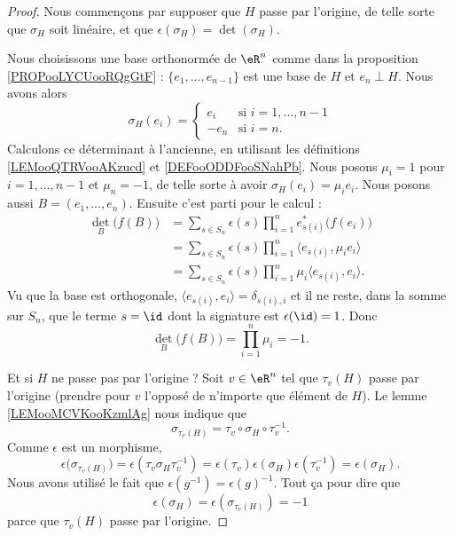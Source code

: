 \begin{proof}
	Nous commençons par supposer que \( H\) passe par l'origine, de telle sorte que \( \sigma_H\) soit linéaire, et que \( \epsilon(\sigma_H)=\det(\sigma_H)\).

	Nous choisissons une base orthonormée de \( \eR^n\) comme dans la proposition \ref{PROPooLYCUooRQgGtF} : \( \{ e_1,\ldots, e_{n-1} \}\) est une base de \( H\) et \( e_n\perp H\). Nous avons alors
	\begin{equation}
		\sigma_H(e_i)=\begin{cases}
			e_i    & \text{si } i=1,\ldots, n-1 \\
			-e_{n} & \text{si } i=n.
		\end{cases}
	\end{equation}
	Calculons ce déterminant à l'ancienne, en utilisant les définitions \ref{LEMooQTRVooAKzucd} et \ref{DEFooODDFooSNahPb}. Nous posons \( \mu_i=1\) pour \( i=1,\ldots, n-1\) et \( \mu_n=-1\), de telle sorte à avoir \( \sigma_H(e_i)=\mu_ie_i\). Nous posons aussi \( B=(e_1,\ldots, e_n)\). Ensuite c'est parti pour le calcul :
	\begin{subequations}
		\begin{align}
			\det_B\big( f(B) \big) & =\sum_{s\in S_n}\epsilon(s)\prod_{i=1}^ne^*_{s(i)}\big( f(e_i) \big)       \\
			                       & =\sum_{s\in S_n}\epsilon(s)\prod_{i=1}^n\langle e_{s(i)}, \mu_ie_i\rangle  \\
			                       & =\sum_{s\in S_n}\epsilon(s)\prod_{i=1}^n\mu_i\langle e_{s(i)}, e_i\rangle.
		\end{align}
	\end{subequations}
	Vu que la base est orthogonale, \( \langle e_{s(i)}, e_i\rangle =\delta_{s(i), i}\) et il ne reste, dans la somme sur \( S_n\), que le terme \( s=\id\) dont la signature est \( \epsilon(\id)=1\). Donc
	\begin{equation}
		\det_B\big( f(B) \big)=\prod_{i=1}^n\mu_i=-1.
	\end{equation}

	Et si \( H\) ne passe pas par l'origine ? Soit \( v\in \eR^n\) tel que \( \tau_v(H)\) passe par l'origine (prendre pour \( v\) l'opposé de n'importe que élément de \( H\)). Le lemme \ref{LEMooMCVKooKzmlAg} nous indique que
	\begin{equation}
		\sigma_{\tau_v(H)}=\tau_v\circ \sigma_H\circ \tau_v^{-1}.
	\end{equation}
	Comme \( \epsilon\) est un morphisme,
	\begin{equation}
		\epsilon\big( \sigma_{\tau_v(H)} \big)=\epsilon(\tau_v\sigma_H\tau_v^{-1})=\epsilon(\tau_v)\epsilon(\sigma_H)\epsilon(\tau_v^{-1})=\epsilon(\sigma_H).
	\end{equation}
	Nous avons utilisé le fait que \( \epsilon(g^{-1})=\epsilon(g)^{-1}\). Tout ça pour dire que
	\begin{equation}
		\epsilon(\sigma_H)=\epsilon(\sigma_{\tau_v(H)})=-1
	\end{equation}
	parce que \( \tau_v(H)\) passe par l'origine.
\end{proof}

